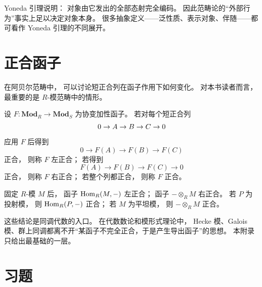 \begin{remark}
Yoneda 引理说明：
对象由它发出的全部态射完全编码。
因此范畴论的“外部行为”事实上足以决定对象本身。
很多抽象定义——泛性质、表示对象、伴随——都可看作 Yoneda 引理的不同展开。
\end{remark}

\section{正合函子}

在阿贝尔范畴中，
可以讨论短正合列在函子作用下如何变化。
对本书读者而言，
最重要的是 $R$-模范畴中的情形。

\begin{definition}
设 $F:\mathbf{Mod}_R\to\mathbf{Mod}_S$ 为协变加性函子。
若对每个短正合列
\[
0 \to A \to B \to C \to 0
\]
应用 $F$ 后得到
\[
0\to F(A)\to F(B)\to F(C)
\]
正合，
则称 $F$ 左正合；
若得到
\[
F(A)\to F(B)\to F(C)\to 0
\]
正合，
则称 $F$ 右正合；
若整个列都正合，
则称 $F$ 正合。
\end{definition}

\begin{proposition}
固定 $R$-模 $M$ 后，
函子 $\mathrm{Hom}_R(M,-)$ 左正合；
函子 $-\otimes_R M$ 右正合。
若 $P$ 为投射模，
则 $\mathrm{Hom}_R(P,-)$ 正合；
若 $M$ 为平坦模，
则 $-\otimes_R M$ 正合。
\end{proposition}

这些结论是同调代数的入口。
在代数数论和模形式理论中，
Hecke 模、Galois 模、群上同调都离不开“某函子不完全正合，于是产生导出函子”的思想。
本附录只给出最基础的一层。

\section*{习题}

